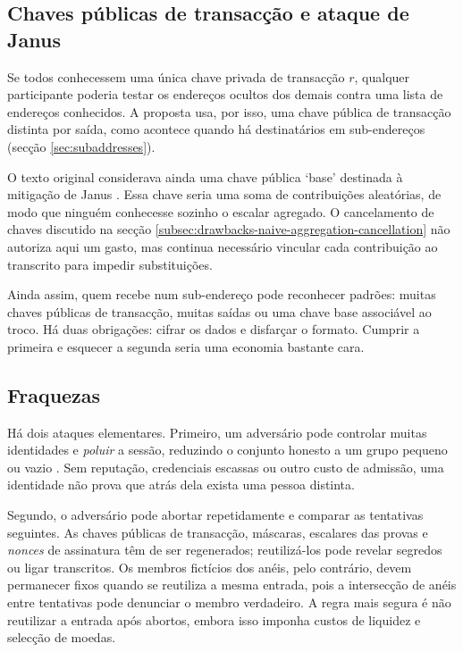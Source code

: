 \subsection{Chaves públicas de transacção e ataque de Janus}

Se todos conhecessem uma única chave privada de transacção \(r\), qualquer
participante poderia testar os endereços ocultos dos demais contra uma lista
de endereços conhecidos. A proposta usa, por isso, uma chave pública de
transacção distinta por saída, como acontece quando há destinatários em
sub-endereços (secção \ref{sec:subaddresses}).

O texto original considerava ainda uma chave pública `base' destinada à
mitigação de Janus \cite{janus-mitigation-issue-62}. Essa chave seria uma soma
de contribuições aleatórias, de modo que ninguém conhecesse sozinho o escalar
agregado. O cancelamento de chaves discutido na secção
\ref{subsec:drawbacks-naive-aggregation-cancellation} não autoriza aqui um
gasto, mas continua necessário vincular cada contribuição ao transcrito para
impedir substituições.

Ainda assim, quem recebe num sub-endereço pode reconhecer padrões: muitas
chaves públicas de transacção, muitas saídas ou uma chave base associável ao
troco. Há duas obrigações: cifrar os dados e disfarçar o formato. Cumprir a
primeira e esquecer a segunda seria uma economia bastante cara.

\subsection{Fraquezas}
\label{subsec:weaknesses-txtangle}

Há dois ataques elementares. Primeiro, um adversário pode controlar muitas
identidades e \emph{poluir} a sessão, reduzindo o conjunto honesto a um grupo
pequeno ou vazio \cite{coinjoin-pollution}. Sem reputação, credenciais escassas
ou outro custo de admissão, uma identidade não prova que atrás dela exista uma
pessoa distinta.

Segundo, o adversário pode abortar repetidamente e comparar as tentativas
seguintes. As chaves públicas de transacção, máscaras, escalares das provas e
\emph{nonces} de assinatura têm de ser regenerados; reutilizá-los pode revelar
segredos ou ligar transcritos. Os membros fictícios dos anéis, pelo contrário,
devem permanecer fixos quando se reutiliza a mesma entrada, pois a intersecção
de anéis entre tentativas pode denunciar o membro verdadeiro. A regra mais
segura é não reutilizar a entrada após abortos, embora isso imponha custos de
liquidez e selecção de moedas.

